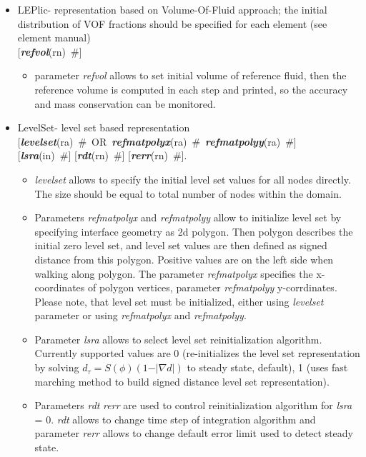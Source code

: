 \documentclass[draft]{article}
\newcommand{\grad}{\nabla}
\newcommand{\param}[1]{{\em #1}}
\newcommand{\keywordnotype}[1]{\mbox{{\it{\bf{#1}}}}}
\newcommand{\keyword}[2]{\mbox{{\keywordnotype{#1}\tiny (#2)}}}
\newcommand{\field}[2]{\mbox{\keyword{#1}{#2}~\#}}
\newcommand{\optField}[2]{\mbox{[\field{#1}{#2}]}}
\begin{document}
\begin{itemize}
\item LEPlic- representation based on Volume-Of-Fluid approach; the initial distribution of VOF fractions should be specified for each element (see element manual)\\
\optField{refvol}{rn}
\begin{itemize}
\item
parameter \param{refvol} allows to set initial volume of reference fluid, then the reference volume is computed in each step and printed, so the accuracy and mass conservation can be monitored.
\end{itemize}
\item[]
LevelSet- level set based representation\\
\mbox{[\field{levelset}{ra} OR \field{refmatpolyx}{ra} \field{refmatpolyy}{ra}]}\\ \optField{lsra}{in} \optField{rdt}{rn} \optField{rerr}{rn}.
\begin{itemize}
\item \param{levelset} allows to specify the initial level set values for all nodes directly. The size should be equal to total number of nodes within the domain. 
\item Parameters \param{refmatpolyx} and \param{refmatpolyy} allow to initialize level set by specifying interface geometry as 2d polygon. Then polygon describes the initial zero level set, and level set values are then defined as signed distance from this polygon. Positive values are on the left side when walking along polygon. The parameter \param{refmatpolyx} specifies the x-coordinates of polygon vertices, parameter \param{refmatpolyy} y-corrdinates. Please note, that level set must be initialized, either using \param{levelset} parameter or using \param{refmatpolyx} and \param{refmatpolyy}.
\item Parameter \param{lsra} allows to select level set reinitialization algorithm. Currently supported values are 0 (re-initializes the level set representation by solving $d_{\tau} = S(\phi)(1-\vert\grad d\vert)$ to steady state, default), 1 (uses fast  marching method to build signed distance level set representation).
\item Parameters \param{rdt} \param{rerr} are used to control reinitialization algorithm for \param{lsra} = 0. \param{rdt} allows to change time step of integration algorithm and parameter \param{rerr} allows to change default error limit used to detect steady state.
\end{itemize}
\end{itemize}
\end{document}
